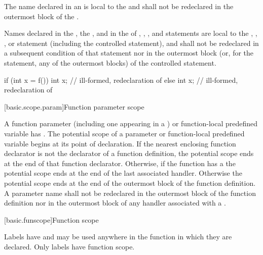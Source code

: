 \pnum
{}%
The name declared in an 
is local to the
 and shall not be redeclared in the outermost block of the
.

\pnum
Names declared in the , the , and in the
 of , , , and
 statements are local to the , ,
, or  statement (including the controlled
statement), and shall not be redeclared in a subsequent condition of
that statement nor in the outermost block (or, for the 
statement, any of the outermost blocks) of the controlled statement.
\begin{example}
\begin{codeblock}
if (int x = f()) {
  int x;            // ill-formed, redeclaration of 
}
else {
  int x;            // ill-formed, redeclaration of 
}
\end{codeblock}
\end{example}

[basic.scope.param]{Function parameter scope}

\pnum
{}%
%
%
A function parameter
(including one appearing in a
)
or function-local predefined variable
has .
The potential scope of a parameter
or function-local predefined variable
begins at its point of declaration. If
the nearest enclosing function declarator
is not the declarator of a function definition,
the potential scope ends at the end of that function declarator.
Otherwise, if
the function has a  the potential scope
ends at the end of the last associated handler.
Otherwise the potential scope ends
at the end of the outermost block of the function definition. A
parameter name shall not be redeclared in the outermost block of the
function definition nor in the outermost block of any handler associated
with a .

[basic.funscope]{Function scope}

\pnum
{}%
Labels have  and
may be used anywhere in the function in which they are declared. Only
labels have function scope.

